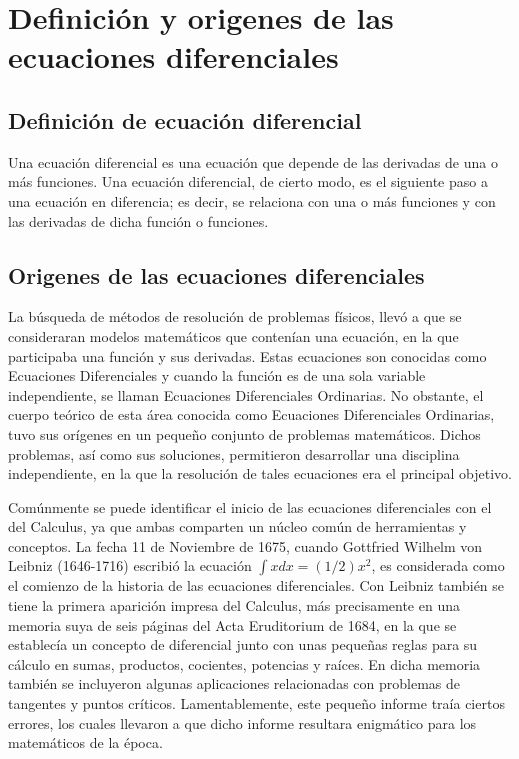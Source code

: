 \documentclass[12pt,a4paper,oneside]{book}
\begin{document}
	
	\chapter{Definición y origenes de las ecuaciones diferenciales \hspace{1 cm}}
	
	\section{Definición de ecuación diferencial}
	\noindent
    Una ecuación diferencial es una ecuación que depende de las derivadas de una o más funciones. Una ecuación diferencial, de cierto modo, es el siguiente paso a una ecuación en diferencia; es decir, se relaciona con una o más funciones y con las derivadas de dicha función o funciones.
    
    
    \section{Origenes de las ecuaciones diferenciales}
    \noindent
	La búsqueda de métodos de resolución de problemas físicos, llevó a que se consideraran modelos matemáticos que contenían una ecuación, en la que participaba una función y sus derivadas. Estas ecuaciones son conocidas como Ecuaciones Diferenciales y cuando la función es de una sola variable independiente, se llaman Ecuaciones Diferenciales Ordinarias. No obstante, el cuerpo teórico de esta área conocida como Ecuaciones Diferenciales Ordinarias, tuvo sus orígenes en un pequeño conjunto de problemas matemáticos. Dichos problemas, así como sus soluciones, permitieron desarrollar una disciplina independiente, en la que la resolución de tales ecuaciones era el principal objetivo.
	
	\medskip
	\noindent
	Comúnmente se puede identificar el inicio de las ecuaciones diferenciales con el del Calculus, ya que ambas comparten un núcleo común de herramientas y conceptos. La fecha 11 de Noviembre de 1675, cuando Gottfried Wilhelm von Leibniz (1646-1716) escribió la ecuación $\int xdx =(1/2) x^2$, es considerada como el comienzo de la historia de las ecuaciones diferenciales. Con Leibniz también se tiene la primera aparición impresa del Calculus, más precisamente en una memoria suya de seis páginas del Acta Eruditorium de 1684, en la que se establecía un concepto de diferencial junto con unas pequeñas reglas para su cálculo en sumas, productos,
	cocientes, potencias y raíces. En dicha memoria también se incluyeron algunas aplicaciones relacionadas con problemas de tangentes y puntos críticos. Lamentablemente, este pequeño informe traía ciertos errores, los cuales llevaron a que dicho informe resultara enigmático para los matemáticos de la época.
	
\end{document}
